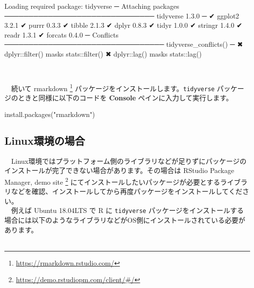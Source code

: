 \documentclass[
  12pt,
]{book}
\newenvironment{Shaded}{\begin{snugshade}}{\end{snugshade}}
\newcommand{\DecValTok}[1]{\textcolor[rgb]{0.00,0.00,0.81}{#1}}
\newcommand{\FloatTok}[1]{\textcolor[rgb]{0.00,0.00,0.81}{#1}}
\newcommand{\FunctionTok}[1]{\textcolor[rgb]{0.00,0.00,0.00}{#1}}
\newcommand{\NormalTok}[1]{#1}
\newcommand{\SpecialCharTok}[1]{\textcolor[rgb]{0.00,0.00,0.00}{#1}}
\newcommand{\StringTok}[1]{\textcolor[rgb]{0.31,0.60,0.02}{#1}}
\DeclareRobustCommand{\href}[2]{#2\footnote{\url{#1}}}
\begin{document}
\begin{Shaded}
\begin{Highlighting}[numbers=left,,]
\NormalTok{Loading required package}\SpecialCharTok{:}\NormalTok{ tidyverse}
\NormalTok{─ Attaching packages ─────────────────────────────── tidyverse }\DecValTok{1}\NormalTok{.}\FloatTok{3.0}\NormalTok{ ─}
\NormalTok{✔ ggplot2 }\DecValTok{3}\NormalTok{.}\FloatTok{2.1}\NormalTok{     ✔ purrr   }\DecValTok{0}\NormalTok{.}\FloatTok{3.3}
\NormalTok{✔ tibble  }\DecValTok{2}\NormalTok{.}\FloatTok{1.3}\NormalTok{     ✔ dplyr   }\DecValTok{0}\NormalTok{.}\FloatTok{8.3}
\NormalTok{✔ tidyr   }\DecValTok{1}\NormalTok{.}\FloatTok{0.0}\NormalTok{     ✔ stringr }\DecValTok{1}\NormalTok{.}\FloatTok{4.0}
\NormalTok{✔ readr   }\DecValTok{1}\NormalTok{.}\FloatTok{3.1}\NormalTok{     ✔ forcats }\DecValTok{0}\NormalTok{.}\FloatTok{4.0}
\NormalTok{─ Conflicts ───────────────────────────────── }\FunctionTok{tidyverse\_conflicts}\NormalTok{() ─}
\NormalTok{✖ dplyr}\SpecialCharTok{::}\FunctionTok{filter}\NormalTok{() masks stats}\SpecialCharTok{::}\FunctionTok{filter}\NormalTok{()}
\NormalTok{✖ dplyr}\SpecialCharTok{::}\FunctionTok{lag}\NormalTok{()    masks stats}\SpecialCharTok{::}\FunctionTok{lag}\NormalTok{()}
\end{Highlighting}
\end{Shaded}

　

　続いて \href{https://rmarkdown.rstudio.com/}{rmarkdown } パッケージをインストールします。\texttt{tidyverse} パッケージのときと同様に以下のコードを \textbf{Console} ペインに入力して実行します。

\begin{Shaded}
\begin{Highlighting}[numbers=left,,]
\FunctionTok{install.packages}\NormalTok{(}\StringTok{"rmarkdown"}\NormalTok{)}
\end{Highlighting}
\end{Shaded}

\hypertarget{linuxux74b0ux5883ux306eux5834ux5408}{%
\subsection{Linux環境の場合}\label{linuxux74b0ux5883ux306eux5834ux5408}}

　Linux環境ではプラットフォーム側のライブラリなどが足りずにパッケージのインストールが完了できない場合があります。その場合は \href{https://demo.rstudiopm.com/client/\#/}{RStudio Package Manager, demo site } にてインストールしたいパッケージが必要とするライブラリなどを確認、インストールしてから再度パッケージをインストールしてください。\\
　例えば Ubuntu 18.04LTS で R に \texttt{tidyverse} パッケージをインストールする場合には以下のようなライブラリなどがOS側にインストールされている必要があります。\\
　
\end{document}
